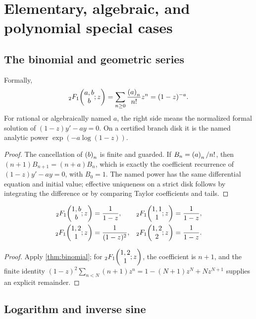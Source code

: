 \section{Elementary, algebraic, and polynomial special cases}\label{sec:special}

\subsection{The binomial and geometric series}

\begin{theorem}\label{thm:binomial}
Formally,
\begin{equation}\label{eq:binomial}
 {}_2F_1\!\left(\begin{matrix}a,b\\b\end{matrix};z\right)=\sum_{n\ge0}\frac{\left(a\right)_{n}}{n!}z^n=(1-z)^{-a}.
\end{equation}
For rational or algebraically named \(a\), the right side means the normalized
formal solution of
\((1-z)y'-ay=0\).  On a certified branch disk it is the named analytic power
\(\exp(-a\log(1-z))\).
\end{theorem}

\begin{proof}
The cancellation of \(\left(b\right)_{n}\) is finite and guarded.  If
\(B_n=\left(a\right)_{n}/n!\), then
\((n+1)B_{n+1}=(n+a)B_n\), which is exactly the coefficient recurrence of
\((1-z)y'-ay=0\), with \(B_0=1\).  The named power has the same differential
equation and initial value; effective uniqueness on a strict disk follows by
integrating the difference or by comparing Taylor coefficients and tails.
\end{proof}

\begin{corollary}
\begin{align*}
 {}_2F_1\!\left(\begin{matrix}1,b\\b\end{matrix};z\right)&=\frac1{1-z}, &
 {}_2F_1\!\left(\begin{matrix}1,1\\1\end{matrix};z\right)&=\frac1{1-z},\\
 {}_2F_1\!\left(\begin{matrix}1,2\\1\end{matrix};z\right)&=\frac1{(1-z)^2}, &
 {}_2F_1\!\left(\begin{matrix}1,2\\2\end{matrix};z\right)&=\frac1{1-z}.
\end{align*}
\end{corollary}

\begin{proof}
Apply \cref{thm:binomial}; for \({}_2F_1\!\left(\begin{matrix}1,2\\1\end{matrix};z\right)\), the coefficient is \(n+1\), and
the finite identity
\((1-z)^2\sum_{n<N}(n+1)z^n=1-(N+1)z^N+Nz^{N+1}\) supplies an explicit
remainder.
\end{proof}

\subsection{Logarithm and inverse sine}

